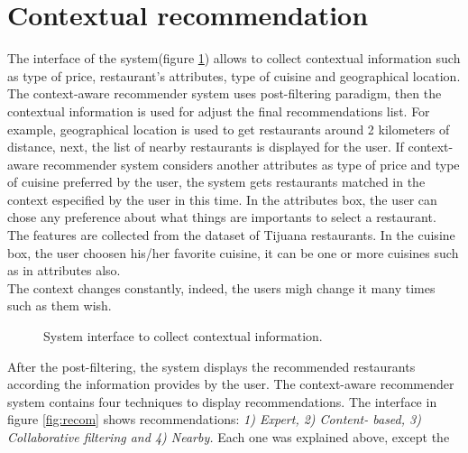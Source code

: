 \section{Contextual recommendation} 

The interface of the system(figure \ref{fig:context}) allows to
collect contextual information such as type of price, restaurant's
attributes, type of cuisine and geographical location. The context-aware recommender system uses post-filtering paradigm, then the
contextual information is used for adjust the final recommendations
list. For example, geographical location is used to get restaurants
around 2 kilometers of distance, next, the list of nearby restaurants
is displayed for the user. If context-aware recommender system
considers another attributes as type of price and type of cuisine
preferred by the user, the system gets restaurants matched in the
context especified by the user in this time. In the attributes box,
the user can chose any preference about what things are importants to
select a restaurant. The features are collected from the dataset of
Tijuana restaurants. In the cuisine box, the user choosen his/her
favorite cuisine, it can be one or more cuisines such as in attributes 
also.\\  
The context changes constantly, indeed, the users migh change 
it many times such as them wish.
\begin{figure}
\captionsetup{justification=centering,margin=2cm,font=footnotesize}
\centering
{}
\caption{System interface to collect contextual information.}
\label{fig:context}   
\end{figure}
After the post-filtering, the system displays the  recommended
restaurants according the information provides by the user. The
context-aware recommender system contains four techniques to display
recommendations. The interface in figure \ref{fig:recom} shows
recommendations: \textit{1) Expert, 2) Content- based, 3) Collaborative
filtering and 4) Nearby.} Each one was explained above, except the
